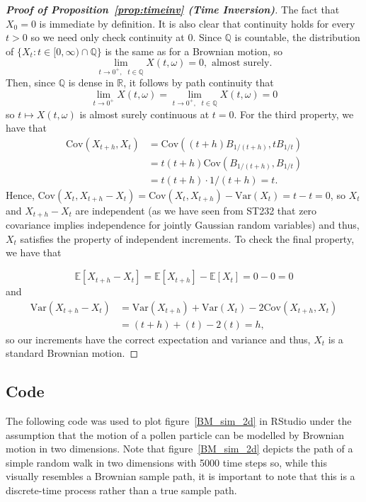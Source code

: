\documentclass[a4paper,11pt]{article}
\theoremstyle{plain}
\theoremstyle{definition}
\begin{document}
\begin{proof}[\textbf{Proof of Proposition~\ref{prop:timeinv} (Time Inversion)}]
\citep[p.~13]{M&P} The fact that $X_{0} = 0$ is immediate by definition. It is also clear that continuity holds for every $t > 0$ so we need only check continuity at $0$. Since $\mathbb{Q}$ is countable, the distribution of $\{X_{t}: t \in [0,\infty) \cap \mathbb{Q}\}$ is the same as for a Brownian motion, so
\[
\lim_{t \to 0^+, \text{ } t \in \mathbb{Q}} X(t,\omega) = 0, \text{ almost surely}.
\]
Then, since $\mathbb{Q}$ is dense in $\mathbb{R}$, it follows by path continuity that
\[
\lim_{t \to 0^+} X(t,\omega)  = \lim_{t \to 0^+, \text{ } t \in \mathbb{Q}} X(t,\omega) = 0
\]
so $t \mapsto X(t,\omega)$ is almost surely continuous at $t = 0$. For the third property, we have that
\[
  \begin{aligned}
    \mathrm{Cov}(X_{t + h}, X_{t}) & = \mathrm{Cov}((t + h)B_{1/(t + h)},tB_{1/t})\\
      & = t(t + h)\mathrm{Cov}(B_{1/(t + h)}, B_{1/t})\\
      & = t(t + h) \cdot 1/(t + h) = t.
  \end{aligned}
\]
Hence, $\mathrm{Cov}(X_{t}, X_{t + h} - X_{t}) = \mathrm{Cov}(X_{t}, X_{t + h}) - \mathrm{Var}(X_{t}) = t - t = 0$, so $X_{t}$ and $X_{t + h} - X_{t}$ are independent (as we have seen from ST232 that zero covariance implies independence for jointly Gaussian random variables) and thus, $X_{t}$ satisfies the property of independent increments. To check the final property, we have that 

\[
\mathbb{E}[X_{t + h} - X_{t}] = \mathbb{E}[X_{t + h}] - \mathbb{E}[X_{t}] = 0 - 0 = 0
\]
and 
\[
  \begin{aligned}
    \mathrm{Var}(X_{t + h} - X_{t}) & = \mathrm{Var}(X_{t + h}) + \mathrm{Var}(X_{t}) - 2\mathrm{Cov}(X_{t + h}, X_{t})\\
      & = (t + h) + (t) - 2(t) = h,
  \end{aligned}
\]
so our increments have the correct expectation and variance and thus, $X_{t}$ is a standard Brownian motion.
\end{proof}

\subsection{Code}\label{app:code}

The following code was used to plot figure~\ref{BM_sim_2d} in RStudio under the assumption that the motion of a pollen particle can be modelled by Brownian motion in two dimensions. Note that figure~\ref{BM_sim_2d} depicts the path of a simple random walk in two dimensions with 5000 time steps so, while this visually resembles a Brownian sample path, it is important to note that this is a discrete-time process rather than a true sample path.
\end{document}
